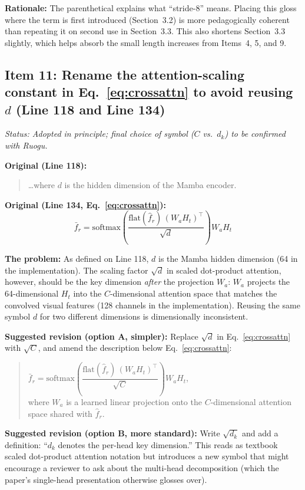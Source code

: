 \documentclass{article}
\begin{document}
\textbf{Rationale:}
The parenthetical explains what ``stride-8'' means. Placing this gloss where the term is first introduced (Section~3.2) is more pedagogically coherent than repeating it on second use in Section~3.3. This also shortens Section~3.3 slightly, which helps absorb the small length increases from Items~4, 5, and 9.

\subsection*{Item 11: Rename the attention-scaling constant in Eq.~\ref{eq:crossattn} to avoid reusing $d$ (Line 118 and Line 134)}

\textit{Status: Adopted in principle; final choice of symbol ($C$ vs.\ $d_k$) to be confirmed with Ruogu.}

\textbf{Original (Line 118):}
\begin{quote}
\ldots where $d$ is the hidden dimension of the Mamba encoder.
\end{quote}

\textbf{Original (Line 134, Eq.~\ref{eq:crossattn}):}
\begin{equation*}
\bar{f}_r = \mathrm{softmax}\!\left(\frac{\mathrm{flat}(\hat{f}_r)\,(W_a H_t)^\top}{\sqrt{d}}\right) W_a H_t
\end{equation*}

\textbf{The problem:}
As defined on Line 118, $d$ is the Mamba hidden dimension (64 in the implementation). The scaling factor $\sqrt{d}$ in scaled dot-product attention, however, should be the key dimension \emph{after} the projection $W_a$: $W_a$ projects the 64-dimensional $H_t$ into the $C$-dimensional attention space that matches the convolved visual features (128 channels in the implementation). Reusing the same symbol $d$ for two different dimensions is dimensionally inconsistent.

\textbf{Suggested revision (option A, simpler):}
Replace $\sqrt{d}$ in Eq.~\ref{eq:crossattn} with $\sqrt{C}$, and amend the description below Eq.~\ref{eq:crossattn}:
\begin{quote}
$\bar{f}_r = \mathrm{softmax}\!\left(\dfrac{\mathrm{flat}(\hat{f}_r)\,(W_a H_t)^\top}{\sqrt{C}}\right) W_a H_t$,\\[2pt]
where $W_a$ is a learned linear projection onto the $C$-dimensional attention space shared with $\hat{f}_r$.
\end{quote}

\textbf{Suggested revision (option B, more standard):}
Write $\sqrt{d_k}$ and add a definition: ``$d_k$ denotes the per-head key dimension.'' This reads as textbook scaled dot-product attention notation but introduces a new symbol that might encourage a reviewer to ask about the multi-head decomposition (which the paper's single-head presentation otherwise glosses over).
\end{document}
